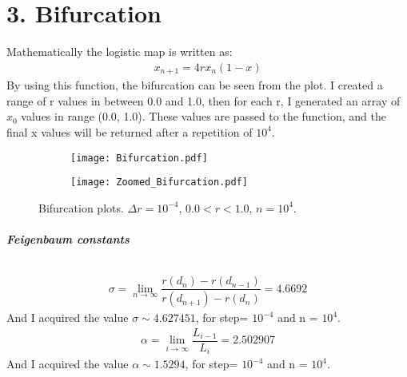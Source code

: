 \documentclass[12pt]{article}
\begin{document}
\part*{3. Bifurcation}
Mathematically the logistic map is written as:
\begin{gather*}
x_{n+1} = 4rx_{n}(1-x)
\end{gather*}
By using this function, the bifurcation can be seen from the plot. I created a range of r values in between 0.0 and 1.0, then for each r, I generated an array of $x_{0}$ values in range (0.0, 1.0). These values are passed to the function, and the final x values will be returned after a repetition of $10^{4}$.
\begin{figure}[H]
	\centering
	\begin{subfigure}{0.6\textwidth}
		\texttt{[image: Bifurcation.pdf]}
		\label{fig:mesh5.2}
		\caption{}
	\end{subfigure}
		\begin{subfigure}{0.6\textwidth}\par\bigskip 
		\texttt{[image: Zoomed\_Bifurcation.pdf]}
		\label{fig:mesh5.2}
		\caption{}
	\end{subfigure}
	\label{fig:mesh}
	\caption{Bifurcation plots. $\Delta r= 10^{-4}$, $0.0<r<1.0$, $n=10^{4}$. }
\end{figure}
\paragraph*{\textbf{Feigenbaum constants}}
\begin{gather*}
\sigma = \lim_{n\rightarrow \infty} \dfrac{r(d_{n})-r(d_{n-1})}{r(d_{n+1})-r(d_{n})} = 4.6692
\end{gather*}
And I acquired the value $\sigma \sim 4.627451$, for step= $10^{-4}$ and n = $10^4$.
\begin{gather*}
\alpha = \lim_{i\rightarrow \infty} \dfrac{L_{i-1}}{L_{i}} = 2.502907
\end{gather*}
And I acquired the value $\alpha \sim 1.5294$, for step= $10^{-4}$ and n = $10^4$.
\end{document}
